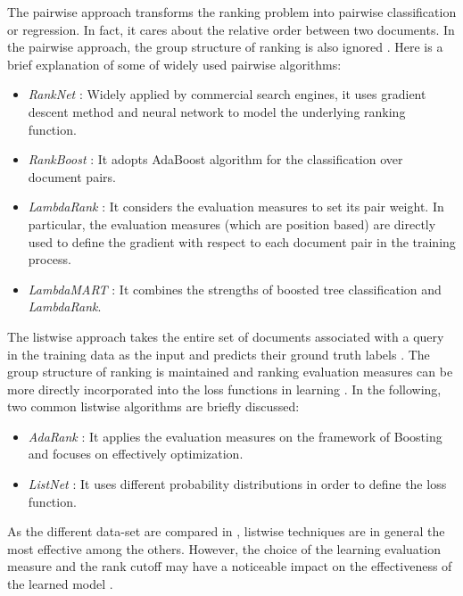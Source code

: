 The pairwise approach transforms the ranking problem into pairwise classification or regression. In fact, it cares about the relative order between two documents. In the pairwise approach, the group structure of ranking is also ignored \citep{l2r-intro}. Here is a brief explanation of some of widely used pairwise algorithms:

\begin{itemize}
\item \textit{RankNet} \citep{l2r-ranknet}: Widely applied by commercial search engines, it uses gradient descent method and neural network to model the underlying ranking function.
\item \textit{RankBoost} \citep{l2r-rankboost}: It adopts AdaBoost algorithm for the classification over document pairs.
\item \textit{LambdaRank} \citep{l2r-lambdarank}: It considers the evaluation measures to set its pair weight. In particular, the evaluation measures (which are position based) are directly used to define the gradient with respect to each document pair in the training process.
\item \textit{LambdaMART} \citep{l2r-lambdamart}: It combines the strengths of boosted tree classification and \textit{LambdaRank}.
\end{itemize}

The listwise approach takes the entire set of documents associated with a query in the training data as the input and predicts their ground truth labels \citep{l2r-book}. The group structure of ranking is maintained and
ranking evaluation measures can be more directly incorporated into the loss functions in learning \citep{l2r-intro}. In the following, two common listwise algorithms are briefly discussed:

\begin{itemize}
\item \textit{AdaRank} \citep{l2r-adarank}: It applies the evaluation measures on the framework of Boosting and focuses on effectively optimization.
\item \textit{ListNet} \citep{l2r-listnet}: It uses different probability distributions in order to define the loss function.
\end{itemize}

As the different data-set are compared in \citet{l2r-book}, listwise techniques are in general the most effective among the others. However, the choice of the learning evaluation measure and the rank cutoff may have a noticeable impact on the effectiveness of the learned model \citep{l2r-when}.

